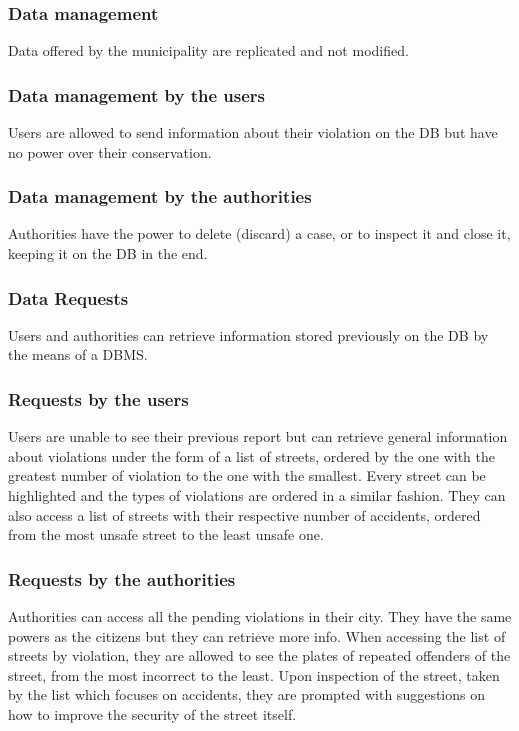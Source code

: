 \subsubsection{Data management}

Data offered by the municipality are replicated and not modified.

\subsubsection*{Data management by the users}

Users are allowed to send information about their violation on 
the DB but have no power over their conservation. 

\subsubsection*{Data management by the authorities}

Authorities have the power to delete (discard) a case, or to inspect it and close 
it, keeping it on the DB in the end. 

\subsubsection{Data Requests}

Users and authorities can retrieve information stored previously on the DB by 
the means of a DBMS.

\subsubsection*{Requests by the users}

Users are unable to see their previous report but can retrieve general information 
about violations under the form of a list of streets, ordered by the one with the 
greatest number of violation to the one with the smallest. Every street can be 
highlighted and the types of violations are ordered in a similar fashion. 
They can also access a list of streets with their respective number of 
accidents, ordered from the most unsafe street to the least unsafe one.

\subsubsection*{Requests by the authorities}

Authorities can access all the pending violations in their city. They have the same 
powers as the citizens but they can retrieve more info. When accessing the list of 
streets by violation, they are allowed to see the plates of repeated offenders of 
the street, from the most incorrect to the least. Upon inspection of the street, 
taken by the list which focuses on accidents, they are prompted with suggestions 
on how to improve the security of the street itself.

